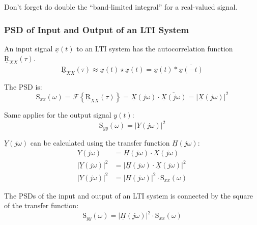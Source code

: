 \begin{refsection}
\begin{attention}
	Don't forget do double the ``band-limited integral'' for a real-valued signal.
\end{attention}

\subsubsection{\acs{PSD} of Input and Output of an \acs{LTI} System}

An input signal $\underline{x}(t)$ to an \ac{LTI} system has the autocorrelation function $\underline{\mathrm{R}}_{XX}(\tau)$.
\begin{equation}
	\underline{\mathrm{R}}_{XX}(\tau) \approx \underline{x}(t) \star \underline{x}(t) = \underline{x}(t) * \overline{\underline{x}(-t)}
\end{equation}

The \ac{PSD} is:
\begin{equation}
	\mathrm{S}_{xx}(\omega) = \mathcal{F}\left\{\underline{\mathrm{R}}_{XX}(\tau)\right\} = \underline{X}\left(j \omega\right) \cdot \overline{\underline{X}\left(j \omega\right)} = \left|\underline{X}\left(j \omega\right)\right|^2
\end{equation}

Same applies for the output signal $\underline{y}(t)$:
\begin{equation}
	\mathrm{S}_{yy}(\omega) = \left|\underline{Y}\left(j \omega\right)\right|^2
\end{equation}

$\underline{Y}\left(j \omega\right)$ can be calculated using the transfer function $\underline{H}\left(j \omega\right)$:
\begin{equation}
	\begin{split}
		\underline{Y}\left(j \omega\right) &= \underline{H}\left(j \omega\right) \cdot \underline{X}\left(j \omega\right) \\
		\left|\underline{Y}\left(j \omega\right)\right|^2 &= \left|\underline{H}\left(j \omega\right) \cdot \underline{X}\left(j \omega\right)\right|^2 \\
		\left|\underline{Y}\left(j \omega\right)\right|^2 &= \left|\underline{H}\left(j \omega\right)\right|^2 \cdot \mathrm{S}_{xx}(\omega)
	\end{split}
\end{equation}

The \acp{PSD} of the input and output of an \acs{LTI} system is connected by the square of the transfer function:
\begin{equation}
	\mathrm{S}_{yy}(\omega) = \left|\underline{H}\left(j \omega\right)\right|^2 \cdot \mathrm{S}_{xx}(\omega)
	\label{eq:ch03:psd_lti_io}
\end{equation}


\end{refsection}

